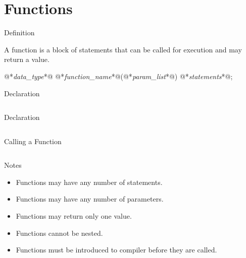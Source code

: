 \documentclass[compress]{beamer}
\begin{document}
\prepareCover

\section{Functions}

\begin{slide}
	\begin{block}{Definition}

	A function is a block of statements that can be called for execution and may return a value.

	\begin{terminal}
	@*\textit{data\_type}*@ @*\textit{function\_name}*@(@*\textit{param\_list}*@)
	{
	    @*\textit{statements}*@;
	}
	\end{terminal}

	\end{block}
\end{slide}

\begin{slide}
	\begin{block}{Declaration}

	\inputminted[firstline=15,lastline=18,linenos]{c}{
		\resDirectory/ls07-function.c
	}

	\end{block}
\end{slide}

\begin{slide}
	\begin{block}{Declaration}

	\inputminted[fontsize=\scriptsize,firstline=24,lastline=37,linenos]{c}{
		\resDirectory/ls07-function.c
	}

	\end{block}
\end{slide}

\begin{slide}
	\begin{block}{Calling a Function}

	\inputminted[fontsize=\small,firstline=43,lastline=50,linenos]{c}{
		\resDirectory/ls07-function.c
	}

	\end{block}
\end{slide}

\begin{slide}
	\begin{block}{Notes}

	\begin{itemize}
	\item[] Functions may have any number of statements.
	\item[] Functions may have any number of parameters.
	\item[] Functions may return only one value.
	\item[] Functions cannot be nested.
	\item[] Functions must be introduced to compiler before they are called.
	\end{itemize}

	\end{block}
\end{slide}
\end{document}
